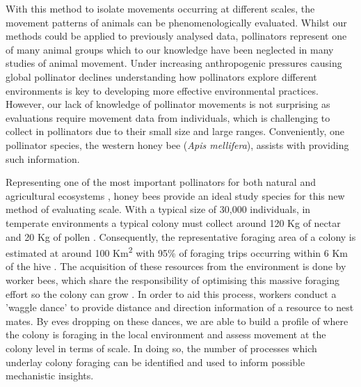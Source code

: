 \documentclass[11pt,usenames,dvipsnames,a4paper]{article}
\begin{document}
\begin{linenumbers}
With this method to isolate movements occurring at different scales, the movement patterns of animals can be phenomenologically evaluated. Whilst our methods could be applied to previously analysed data, pollinators represent one of many animal groups which to our knowledge have been neglected in many studies of animal movement. Under increasing anthropogenic pressures causing global pollinator declines \citep{Powney2019} understanding how pollinators explore different environments is key to developing more effective environmental practices. However, our lack of knowledge of pollinator movements is not surprising as evaluations require movement data from individuals, which is challenging to collect in pollinators due to their small size and large ranges. Conveniently, one pollinator species, the western honey bee (\textit{Apis mellifera}), assists with providing such information.  

Representing one of the most important pollinators for both natural and agricultural ecosystems \citep{Albrecht2018}, honey bees provide an ideal study species for this new method of evaluating scale. With a typical size of 30,000 individuals, in temperate environments a typical colony must collect around 120 Kg of nectar and 20 Kg of pollen \citep{Seeley1995}. Consequently, the representative foraging area of a colony is estimated at around 100 Km\textsuperscript{2} with 95\% of foraging trips occurring within 6 Km of the hive \citep{Samuelson2017}. The acquisition of these resources from the environment is done by worker bees, which share the responsibility of optimising this massive foraging effort so the colony can grow \citep{Samuelson2017}. In order to aid this process, workers conduct a 'waggle dance' to provide distance and direction information of a resource to nest mates. By eves dropping on these dances, we are able to build a profile of where the colony is foraging in the local environment and assess movement at the colony level in terms of scale. In doing so, the number of processes which underlay colony foraging can be identified and used to inform possible mechanistic insights.


\end{linenumbers}
\end{document}
